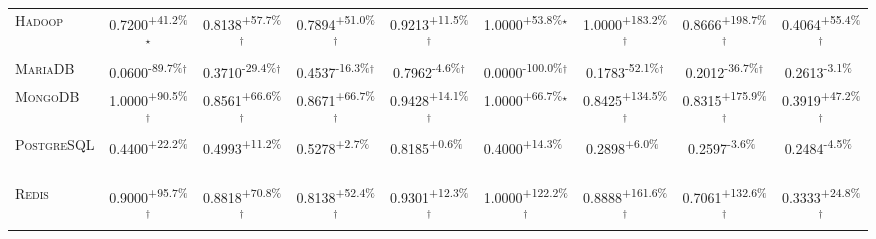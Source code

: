 \begin{table}[htbp]
\begin{tabular}{l|cccc|cccc}
\textsc{Hadoop} & \cellcolor{green!30}0.7200\textsuperscript{+41.2\%}$^\star$ & \cellcolor{green!30}0.8138\textsuperscript{+57.7\%}$^\dagger$ & \cellcolor{green!30}0.7894\textsuperscript{+51.0\%}$^\dagger$ & \cellcolor{green!30}0.9213\textsuperscript{+11.5\%}$^\dagger$ & \cellcolor{green!30}1.0000\textsuperscript{+53.8\%}$^\star$ & \cellcolor{green!30}1.0000\textsuperscript{+183.2\%}$^\dagger$ & \cellcolor{green!30}0.8666\textsuperscript{+198.7\%}$^\dagger$ & \cellcolor{green!30}0.4064\textsuperscript{+55.4\%}$^\dagger$ \\
\textsc{MariaDB} & \cellcolor{red!30}0.0600\textsuperscript{-89.7\%}$^\dagger$ & \cellcolor{red!30}0.3710\textsuperscript{-29.4\%}$^\dagger$ & \cellcolor{red!30}0.4537\textsuperscript{-16.3\%}$^\dagger$ & \cellcolor{red!30}0.7962\textsuperscript{-4.6\%}$^\dagger$ & \cellcolor{red!30}0.0000\textsuperscript{-100.0\%}$^\dagger$ & \cellcolor{red!30}0.1783\textsuperscript{-52.1\%}$^\dagger$ & \cellcolor{red!30}0.2012\textsuperscript{-36.7\%}$^\dagger$ & \cellcolor{red!30}0.2613\textsuperscript{-3.1\%}$^{\,\,\,}$ \\
\textsc{MongoDB} & \cellcolor{green!30}1.0000\textsuperscript{+90.5\%}$^\dagger$ & \cellcolor{green!30}0.8561\textsuperscript{+66.6\%}$^\dagger$ & \cellcolor{green!30}0.8671\textsuperscript{+66.7\%}$^\dagger$ & \cellcolor{green!30}0.9428\textsuperscript{+14.1\%}$^\dagger$ & \cellcolor{green!30}1.0000\textsuperscript{+66.7\%}$^\star$ & \cellcolor{green!30}0.8425\textsuperscript{+134.5\%}$^\dagger$ & \cellcolor{green!30}0.8315\textsuperscript{+175.9\%}$^\dagger$ & \cellcolor{green!30}0.3919\textsuperscript{+47.2\%}$^\dagger$ \\
\textsc{PostgreSQL} & \cellcolor{green!30}0.4400\textsuperscript{+22.2\%}$^{\,\,\,}$ & \cellcolor{green!30}0.4993\textsuperscript{+11.2\%}$^{\,\,\,}$ & \cellcolor{green!30}0.5278\textsuperscript{+2.7\%}$^{\,\,\,}$ & \cellcolor{green!30}0.8185\textsuperscript{+0.6\%}$^{\,\,\,}$ & \cellcolor{green!30}0.4000\textsuperscript{+14.3\%}$^{\,\,\,}$ & \cellcolor{green!30}0.2898\textsuperscript{+6.0\%}$^{\,\,\,}$ & \cellcolor{red!30}0.2597\textsuperscript{-3.6\%}$^{\,\,\,}$ & \cellcolor{red!30}0.2484\textsuperscript{-4.5\%}$^{\,\,\,}$ \\
\textsc{Redis} & \cellcolor{green!30}0.9000\textsuperscript{+95.7\%}$^\dagger$ & \cellcolor{green!30}0.8818\textsuperscript{+70.8\%}$^\dagger$ & \cellcolor{green!30}0.8138\textsuperscript{+52.4\%}$^\dagger$ & \cellcolor{green!30}0.9301\textsuperscript{+12.3\%}$^\dagger$ & \cellcolor{green!30}1.0000\textsuperscript{+122.2\%}$^\dagger$ & \cellcolor{green!30}0.8888\textsuperscript{+161.6\%}$^\dagger$ & \cellcolor{green!30}0.7061\textsuperscript{+132.6\%}$^\dagger$ & \cellcolor{green!30}0.3333\textsuperscript{+24.8\%}$^\dagger$ \\

\end{tabular}
\end{table}
